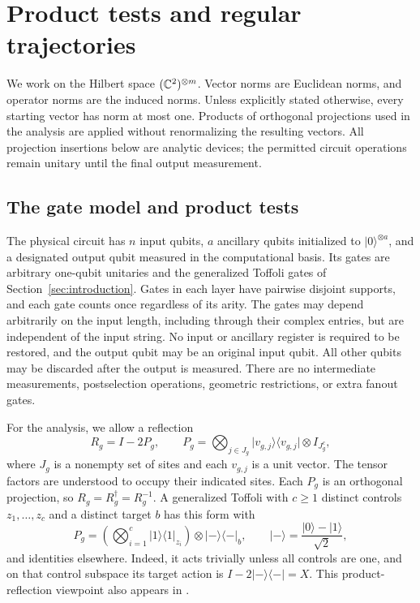 \section{Product tests and regular trajectories}
\label{sec:framework}

We work on the Hilbert space $(\mathbb C^2)^{\otimes m}$.  Vector norms are
Euclidean norms, and operator norms are the induced norms.  Unless explicitly
stated otherwise, every starting vector has norm at most one.  Products of
orthogonal projections used in the analysis are applied without renormalizing
the resulting vectors.
All projection insertions below are analytic devices; the permitted
circuit operations remain unitary until the final output measurement.

\subsection{The gate model and product tests}

The physical circuit has $n$ input qubits, $a$ ancillary qubits initialized to
$\lvert0\rangle^{\otimes a}$, and a designated output qubit measured in the
computational basis.  Its gates are arbitrary one-qubit unitaries and the
generalized Toffoli gates of Section~\ref{sec:introduction}.  Gates in each layer have pairwise
disjoint supports, and each gate counts once regardless of its arity.
The gates may depend arbitrarily on the input length,
including through their complex entries, but are independent of the input
string.  No input or ancillary register is required to be restored, and the
output qubit may be an original input qubit.  All other qubits may be discarded
after the output is measured.  There are no intermediate measurements,
postselection operations, geometric restrictions, or extra fanout gates.

For the analysis, we allow a reflection
\[
 R_g=I-2P_g,
 \qquad
 P_g=\bigotimes_{j\in J_g}\lvert v_{g,j}\rangle\langle v_{g,j}\rvert
       \otimes I_{J_g^c},
\]
where $J_g$ is a nonempty set of sites and each $v_{g,j}$ is a unit vector.
The tensor factors are understood to occupy their indicated sites.  Each
$P_g$ is an orthogonal projection, so $R_g=R_g^\dagger=R_g^{-1}$.
A generalized Toffoli with $c\ge1$ distinct controls $z_1,\ldots,z_c$ and
a distinct target $b$ has this form with
\[
 P_g=\left(\bigotimes_{i=1}^{c}\lvert1\rangle\langle1\rvert_{z_i}\right)
       \otimes\lvert-\rangle\langle-\rvert_b,
 \qquad
 \lvert-\rangle=\frac{\lvert0\rangle-\lvert1\rangle}{\sqrt2},
\]
and identities elsewhere.  Indeed, it acts trivially unless all controls are
one, and on that control subspace its target action is
$I-2\lvert-\rangle\langle-\rvert=X$.
This product-reflection viewpoint also appears in
\citet{Rosenthal2021}.

